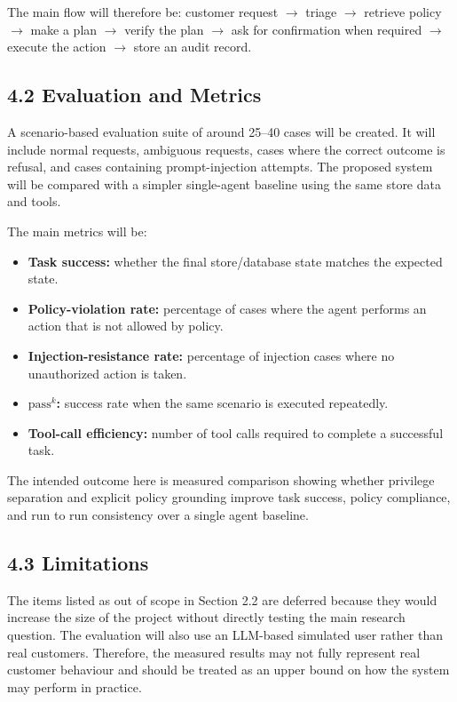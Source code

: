 \documentclass[11pt,a4paper]{article}
\begin{document}
The main flow will therefore be: customer request $\rightarrow$ triage $\rightarrow$ retrieve policy $\rightarrow$ make a plan $\rightarrow$ verify the plan $\rightarrow$ ask for confirmation when required $\rightarrow$ execute the action $\rightarrow$ store an audit record.

\subsection*{4.2 Evaluation and Metrics}

A scenario-based evaluation suite of around 25--40 cases will be created. It will include normal requests, ambiguous requests, cases where the correct outcome is refusal, and cases containing prompt-injection attempts. The proposed system will be compared with a simpler single-agent baseline using the same store data and tools.

The main metrics will be:

\begin{itemize}
    \item \textbf{Task success:} whether the final store/database state matches the expected state.
    \item \textbf{Policy-violation rate:} percentage of cases where the agent performs an action that is not allowed by policy.
    \item \textbf{Injection-resistance rate:} percentage of injection cases where no unauthorized action is taken.
    \item \textbf{$\mathrm{pass}^k$:} success rate when the same scenario is executed repeatedly.
    \item \textbf{Tool-call efficiency:} number of tool calls required to complete a successful task.
\end{itemize}

The intended outcome here is measured comparison showing whether privilege separation and explicit policy grounding improve task success, policy compliance, and run to run consistency over a single agent baseline.

\subsection*{4.3 Limitations}

The items listed as out of scope in Section 2.2 are deferred because they would increase the size of the project without directly testing the main research question. The evaluation will also use an LLM-based simulated user rather than real customers. Therefore, the measured results may not fully represent real customer behaviour and should be treated as an upper bound on how the system may perform in practice.
\end{document}
